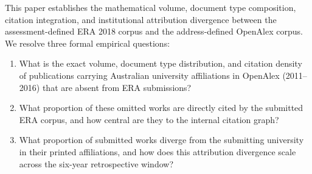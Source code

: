 This paper establishes the mathematical volume, document type composition, citation integration, and institutional attribution divergence between the assessment-defined ERA 2018 corpus and the address-defined OpenAlex corpus. We resolve three formal empirical questions:
\begin{enumerate}
    \item What is the exact volume, document type distribution, and citation density of publications carrying Australian university affiliations in OpenAlex (2011--2016) that are absent from ERA submissions?
    \item What proportion of these omitted works are directly cited by the submitted ERA corpus, and how central are they to the internal citation graph?
    \item What proportion of submitted works diverge from the submitting university in their printed affiliations, and how does this attribution divergence scale across the six-year retrospective window?
\end{enumerate}
